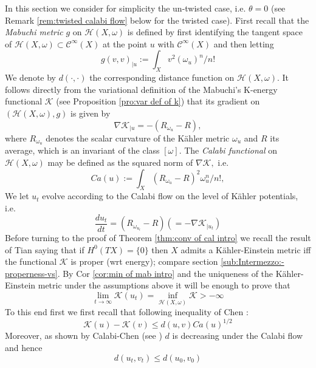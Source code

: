 \documentclass[11pt,oneside,english]{amsart}
\numberwithin{equation}{section}
\numberwithin{figure}{section}
\theoremstyle{plain}
\theoremstyle{plain}
\theoremstyle{plain}
\theoremstyle{plain}
\theoremstyle{remark}
\theoremstyle{definition}
\begin{document}
In this section we consider for simplicity the un-twisted case, i.e.
$\theta=0$ (see Remark \ref{rem:twisted calabi flow} below for the
twisted case). First recall that the \emph{Mabuchi metric} $g$ on
$\mathcal{H}(X,\omega)$ is defined by first identifying the tangent
space of $\mathcal{H}(X,\omega)\subset\mathcal{C}^{\infty}(X)$ at
the point $u$ with $\mathcal{C}^{\infty}(X)$ and then letting 
\[
g(v,v)_{|u}:=\int_{X}v^{2}(\omega_{u})^{n}/n!
\]
 We denote by $d(\cdot,\cdot)$ the corresponding distance function
on $\mathcal{H}(X,\omega).$ It follows directly from the variational
definition of the Mabuchi's K-energy functional $\mathcal{K}$ (see
Proposition \ref{pro:var def of k}) that its gradient on $(\mathcal{H}(X,\omega),g)$
is given by 
\[
\nabla\mathcal{K}_{|u}=-(R_{\omega_{u}}-R),
\]
 where $R_{\omega_{u}}$ denotes the scalar curvature of the Kähler
metric $\omega_{u}$ and $R$ its average, which is an invariant of
the class $[\omega].$ The \emph{Calabi functional} on $\mathcal{H}(X,\omega)$
may be defined as the squared norm of $\nabla\mathcal{K},$ i.e. 
\[
Ca(u):=\int_{X}(R_{\omega_{u}}-R)^{2}\omega_{u}^{n}/n!,
\]
We let $u_{t}$ evolve according to the Calabi flow on the level of
Kähler potentials, i.e. 
\begin{equation}
\frac{du_{t}}{dt}=(R_{\omega_{u_{t}}}-R)(=-\nabla\mathcal{K}_{|u_{t}})\label{eq:calabi flow on potentials}
\end{equation}
Before turning to the proof of Theorem \ref{thm:conv of cal intro}
we recall the result of Tian \cite{ti} saying that if $H^{0}(TX)=\{0\}$
then $X$ admits a Kähler-Einstein metric iff the functional $\mathcal{K}$
is proper (wrt energy); compare section \ref{sub:Intermezzo:-properness-vs}.
By Cor \ref{cor:min of mab intro} and the uniqueness of the Kähler-Einstein
metric under the assumptions above \cite{b-m} it will be enough to
prove that 
\begin{equation}
\lim_{t\rightarrow\infty}\mathcal{K}(u_{t})=\inf_{\mathcal{H}(X,\omega)}\mathcal{K}>-\infty\label{eq:flow minim seq}
\end{equation}
 To this end first we first recall that following inequality of Chen
\cite{chen}: 
\begin{equation}
\mathcal{K}(u)-\mathcal{K}(v)\leq d(u,v)Ca(u)^{1/2}\label{eq:k bounded by dist cal}
\end{equation}
 Moreover, as shown by Calabi-Chen (see \cite{ca-ch}) $d$ is decreasing
under the Calabi flow and hence 
\begin{equation}
d(u_{t},v_{t})\leq d(u_{0},v_{0})\label{eq:decreasing under cal flow}
\end{equation}
\end{document}
